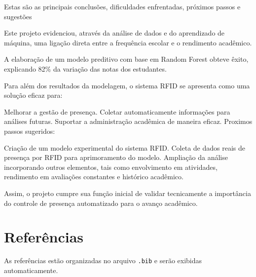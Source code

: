 \documentclass[
  letterpaper,
]{article}
\begin{document}
Estas são as principais conclusões, dificuldades enfrentadas, próximos
passos e sugestões

Este projeto evidenciou, através da análise de dados e do aprendizado de
máquina, uma ligação direta entre a frequência escolar e o rendimento
acadêmico.

A elaboração de um modelo preditivo com base em Random Forest obteve
êxito, explicando 82\% da variação das notas dos estudantes.

Para além dos resultados da modelagem, o sistema RFID se apresenta como
uma solução eficaz para:

Melhorar a gestão de presença. Coletar automaticamente informações para
análises futuras. Suportar a administração acadêmica de maneira eficaz.
Proximos passos sugeridos:

Criação de um modelo experimental do sistema RFID. Coleta de dados reais
de presença por RFID para aprimoramento do modelo. Ampliação da análise
incorporando outros elementos, tais como envolvimento em atividades,
rendimento em avaliações constantes e histórico acadêmico.

Assim, o projeto cumpre sua função inicial de validar tecnicamente a
importância do controle de presença automatizado para o avanço
acadêmico.


\chapter{Referências}\label{referuxeancias}

As referências estão organizadas no arquivo \texttt{.bib} e serão
exibidas automaticamente.

\label{refs}
\end{document}
